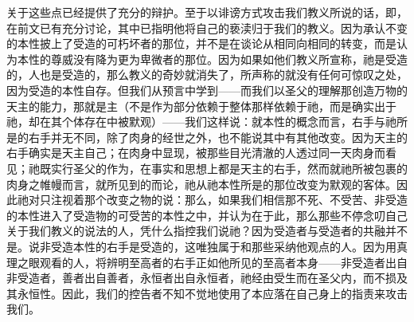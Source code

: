 关于这些点已经提供了充分的辩护。至于以诽谤方式攻击我们教义所说的话，即，在前文已有充分讨论，其中已指明他将自己的亵渎归于我们的教义。因为承认不变的本性披上了受造的可朽坏者的那位，并不是在谈论从相同向相同的转变，而是认为本性的尊威没有降为更为卑微者的那位。因为如果如他们教义所宣称，祂是受造的，人也是受造的，那么教义的奇妙就消失了，所声称的就没有任何可惊叹之处，因为受造的本性自存。但我们从预言中学到——而我们以圣父的理解那创造万物的天主的能力，那就是主（不是作为部分依赖于整体那样依赖于祂，而是确实出于祂，却在其个体存在中被默观）——我们这样说：就本性的概念而言，右手与祂所是的右手并无不同，除了肉身的经世之外，也不能说其中有其他改变。因为天主的右手确实是天主自己；在肉身中显现，被那些目光清澈的人透过同一天肉身而看见；祂既实行圣父的作为，在事实和思想上都是天主的右手，然而就祂所被包裹的肉身之帷幔而言，就所见到的而论，祂从祂本性所是的那位改变为默观的客体。因此祂对只注视着那个改变之物的说：那么，如果我们相信那不死、不受苦、非受造的本性进入了受造物的可受苦的本性之中，并认为在于此，那么那些不停念叨自己关于我们教义的说法的人，凭什么指控我们说祂？因为受造者与受造者的共融并不是。说非受造本性的右手是受造的，这唯独属于和那些采纳他观点的人。因为用真理之眼观看的人，将辨明至高者的右手正如他所见的至高者本身——非受造者出自非受造者，善者出自善者，永恒者出自永恒者，祂经由受生而在圣父内，而不损及其永恒性。因此，我们的控告者不知不觉地使用了本应落在自己身上的指责来攻击我们。\par

